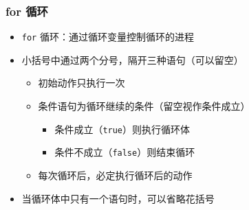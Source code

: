 \begin{frame}[fragile]
    \frametitle{for 循环}

    \begin{overlayarea}{\textwidth}{.9\textheight}
        \begin{itemize}
            \item \lstinline|for| 循环：通过循环变量控制循环的进程

                

            \item 小括号中通过两个分号，隔开三种语句（可以留空）

                \begin{itemize}
                    \item<2-> 初始动作只执行一次

                    \item<3-> 条件语句为循环继续的条件（留空视作条件成立）

                        \begin{itemize}
                            \item 条件成立（\lstinline|true|）则执行循环体
                            \item 条件不成立（\lstinline|false|）则结束循环
                        \end{itemize}

                    \item<4-> 每次循环后，必定执行循环后的动作
                \end{itemize}

            \item<5-> 当循环体中只有一个语句时，可以省略花括号
        \end{itemize}
    \end{overlayarea}
\end{frame}

